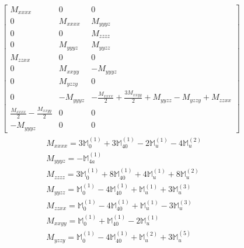\documentclass[fleqn,8pt,landscape]{jsarticle}
\begin{document}
\begin{align*}
\begin{bmatrix} M_{xxxx} & 0 & 0 \\ 0 & M_{xxxx} & M_{yyyz} \\ 0 & 0 & M_{zzzz} \\ 0 & M_{yyyz} & M_{yyzz} \\ M_{zzxx} & 0 & 0 \\ 0 & M_{xxyy} & - M_{yyyz} \\ 0 & M_{yzzy} & 0 \\ 0 & - M_{yyyz} & - \frac{M_{xxxx}}{2} + \frac{3 M_{xxyy}}{2} + M_{yyzz} - M_{yzzy} + M_{zzxx} \\ \frac{M_{xxxx}}{2} - \frac{M_{xxyy}}{2} & 0 & 0 \\ - M_{yyyz} & 0 & 0 \end{bmatrix}
\end{align*}
\begin{align*}
& M_{xxxx} = 3 \mathbb{M}_{0}^{(1)} + 3 \mathbb{M}_{40}^{(1)} - 2 \mathbb{M}_{u}^{(1)} - 4 \mathbb{M}_{u}^{(2)} \\
& M_{yyyz} = - \mathbb{M}_{4a}^{(1)} \\
& M_{zzzz} = 3 \mathbb{M}_{0}^{(1)} + 8 \mathbb{M}_{40}^{(1)} + 4 \mathbb{M}_{u}^{(1)} + 8 \mathbb{M}_{u}^{(2)} \\
& M_{yyzz} = \mathbb{M}_{0}^{(1)} - 4 \mathbb{M}_{40}^{(1)} + \mathbb{M}_{u}^{(1)} + 3 \mathbb{M}_{u}^{(3)} \\
& M_{zzxx} = \mathbb{M}_{0}^{(1)} - 4 \mathbb{M}_{40}^{(1)} + \mathbb{M}_{u}^{(1)} - 3 \mathbb{M}_{u}^{(3)} \\
& M_{xxyy} = \mathbb{M}_{0}^{(1)} + \mathbb{M}_{40}^{(1)} - 2 \mathbb{M}_{u}^{(1)} \\
& M_{yzzy} = \mathbb{M}_{0}^{(1)} - 4 \mathbb{M}_{40}^{(1)} + \mathbb{M}_{u}^{(2)} + 3 \mathbb{M}_{u}^{(5)}
\end{align*}
\end{document}
